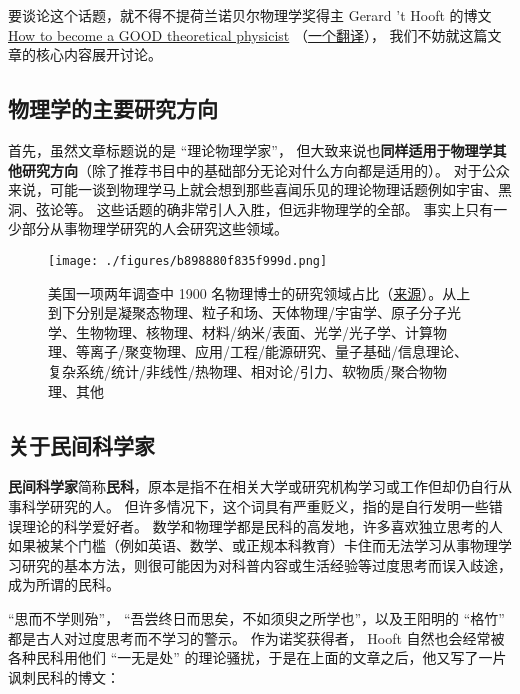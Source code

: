 
\begin{issues}
\issueDraft
\end{issues}

要谈论这个话题，就不得不提荷兰诺贝尔物理学奖得主 Gerard 't Hooft 的博文 \href{https://webspace.science.uu.nl/~hooft101/theorist.html}{How to become a GOOD theoretical physicist} （\href{https://xialab.pku.edu.cn/kytdyw1/zdylm.m.jsp?wbtreeid=1011&tstreeid=11956&_t_uid=2945&language=en&homepageuuid=BF649325C5584FC683CE0B601D21AC65&templateuuid=4CC182410BA14FF8B55ED726FB2087FB&producttype=0&_tmode_=99&tsitesapptype=zdylm}{一个翻译}）， 我们不妨就这篇文章的核心内容展开讨论。

\subsection{物理学的主要研究方向}
首先，虽然文章标题说的是 “理论物理学家”， 但大致来说也\textbf{同样适用于物理学其他研究方向}（除了推荐书目中的基础部分无论对什么方向都是适用的）。 对于公众来说，可能一谈到物理学马上就会想到那些喜闻乐见的理论物理话题例如宇宙、黑洞、弦论等。 这些话题的确非常引人入胜，但远非物理学的全部。 事实上只有一少部分从事物理学研究的人会研究这些领域。

\begin{figure}[ht]
\centering
\texttt{[image: ./figures/b898880f835f999d.png]}
\caption{美国一项两年调查中 1900 名物理博士的研究领域占比（\href{https://ww2.aip.org/statistics/trends-in-physics-phds}{来源}）。从上到下分别是凝聚态物理、粒子和场、天体物理/宇宙学、原子分子光学、生物物理、核物理、材料/纳米/表面、光学/光子学、计算物理、等离子/聚变物理、应用/工程/能源研究、量子基础/信息理论、复杂系统/统计/非线性/热物理、相对论/引力、软物质/聚合物物理、其他} \label{fig_SdyPhy_1}
\end{figure}

\subsection{关于民间科学家}
\textbf{民间科学家}简称\textbf{民科}，原本是指不在相关大学或研究机构学习或工作但却仍自行从事科学研究的人。 但许多情况下，这个词具有严重贬义，指的是自行发明一些错误理论的科学爱好者。 数学和物理学都是民科的高发地，许多喜欢独立思考的人如果被某个门槛（例如英语、数学、或正规本科教育）卡住而无法学习从事物理学习研究的基本方法，则很可能因为对科普内容或生活经验等过度思考而误入歧途，成为所谓的民科。

“思而不学则殆”， “吾尝终日而思矣，不如须臾之所学也”，以及王阳明的 “格竹” 都是古人对过度思考而不学习的警示。 作为诺奖获得者， Hooft 自然也会经常被各种民科用他们 “一无是处” 的理论骚扰，于是在上面的文章之后，他又写了一片讽刺民科的博文：

